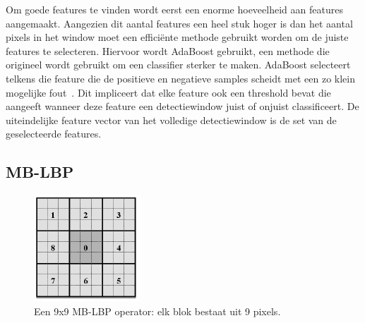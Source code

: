 Om goede features te vinden wordt eerst een enorme hoeveelheid aan features aangemaakt. Aangezien dit aantal features een heel stuk hoger is dan het aantal pixels in het window moet een effici\"ente methode gebruikt worden om de juiste features te selecteren. Hiervoor wordt AdaBoost gebruikt, een methode die origineel wordt gebruikt om een classifier sterker te maken. AdaBoost selecteert telkens die feature die de positieve en negatieve samples scheidt met een zo klein mogelijke fout~\cite{viola2001rapid}. Dit impliceert dat elke feature ook een threshold bevat die aangeeft wanneer deze feature een detectiewindow juist of onjuist classificeert. De uiteindelijke feature vector van het volledige detectiewindow is de set van de geselecteerde features.

%

\subsection{MB-LBP} \label{sec:feat_mblbp}

\begin{figure}
  \centering
  \includegraphics[width=.3\linewidth]{img/lbp}
  \caption{Een 9x9 MB-LBP operator: elk blok bestaat uit 9 pixels.}
  \label{fig:lbp}
\end{figure}

